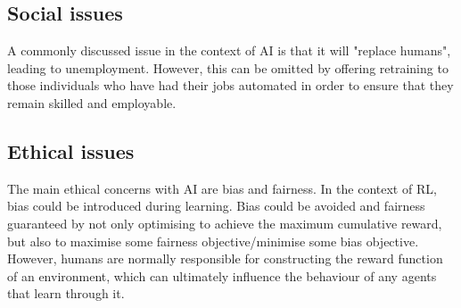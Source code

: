 \begin{appendices}
\subsection{Social issues}
A commonly discussed issue in the context of AI is that it will "replace humans", leading to unemployment. However, this can be omitted by offering retraining to those individuals who have had their jobs automated in order to ensure that they remain skilled and employable.
\subsection{Ethical issues}
The main ethical concerns with AI are bias and fairness. In the context of RL, bias could be introduced during learning. Bias could be avoided and fairness guaranteed by not only optimising to achieve the maximum cumulative reward, but also to maximise some fairness objective/minimise some bias objective. However, humans are normally responsible for constructing the reward function of an environment, which can ultimately influence the behaviour of any agents that learn through it.



\end{appendices}
